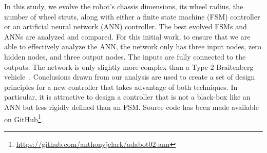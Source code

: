 In this study, we evolve the robot's chassis dimensions, its wheel radius, the number of wheel struts,
along with either a finite state machine (FSM) controller or an artificial neural network (ANN) controller.
%
The best evolved FSMs and ANNs are analyzed and compared.
%
For this initial work, to ensure that we are able to effectively analyze the ANN, the network only has three input nodes, zero hidden nodes, and three output nodes. The inputs are fully connected to the outputs.
%
The network is only slightly more complex than a Type 2 Braitenberg vehicle~\citep{Braitenberg.Vehicles.Book.1986}.
%
Conclusions drawn from our analysis are used to create a set of design principles for a new controller that takes advantage of both techniques.
%
In particular, it is attractive to design a controller that is not a black-box like an ANN but less rigidly defined than an FSM.
%
%
%
%
%
%
Source code has been made available on GitHub\footnote{\url{https://github.com/anthonyjclark/adabot02-ann}}.


